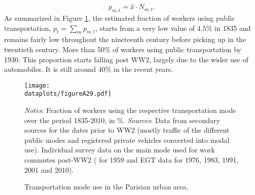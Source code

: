 \documentclass[11pt]{report}
\newcommand{\dataplots}{../output/data/plots}
\begin{document}
\begin{equation*}
p_{m,t}=\hat{x} \cdot N_{m,t}.
\end{equation*}
As summarized in Figure \ref{A-fig:mode}, the estimated fraction of workers using public transportation, $p_t=\sum_m p_{m,t}$, starts from a very low value of $4.5\%$ in 1835 and remains fairly low throughout the nineteenth century before picking up in the twentieth century. More than 50\% of workers using public transportation by 1930. This proportion starts falling post WW2, largely due to the wider use of automobiles. It is still around 40\% in the recent years.


\begin{figure}[h!]
	\begin{center}
		\texttt{[image: \\dataplots/figureA29.pdf]}
	\end{center}
	\vspace{-0.5cm}
	\caption{Transportation mode use in the Parisian urban area.\label{A-fig:mode}}
	
	\footnotesize {\textit{%
			Notes}: Fraction of workers using the respective transportation mode over the period 1835-2010, in \%.
		\textit{Sources}: Data from secondary sources for the dates prior to WW2 (mostly traffic of the different public modes and registered private vehicles converted into modal use). Individual survey data on the main mode used for work commutes post-WW2 (\cite{bertrand1962enquete} for 1959 and EGT data for 1976, 1983, 1991, 2001 and 2010).}
\end{figure}
\end{document}
